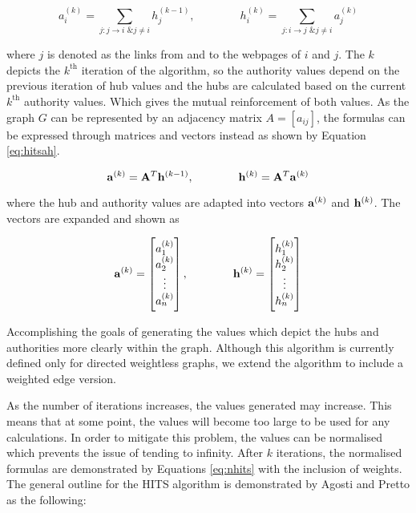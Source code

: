 \begin{equation}
a_i^{(k)} = \sum_{j:j\rightarrow i \text{ \& } j \ne i}h_j^{(k-1)} , \qquad \qquad h_i^{(k)} = \sum_{j:i \rightarrow j \text{ \& } j \ne i}a_j^{(k)}
\end{equation}

where $j$ is denoted as the links from and to the webpages of $i$ and $j$. The $k$ depicts the $k^{\text{th}}$ iteration of the algorithm, so the authority values depend on the previous iteration of hub values and the hubs are calculated based on the current $k^{\text{th}}$ authority values. Which gives the mutual reinforcement of both values. As the graph $G$ can be represented by an adjacency matrix $A = [a_{ij}]$, the formulas can be expressed through matrices \cite{chatzigeorgiou2006application} and vectors instead as shown by Equation \ref{eq:hitsah}.

\begin{equation}\label{eq:hitsah}
\bold{a}^{(k)} = \bold{A}^{T}\bold{h}^{(k-1)} , \qquad \qquad \bold{h}^{(k)} = \bold{A}^{T}\bold{a}^{(k)}
\end{equation}

where the hub and authority values are adapted into vectors $\bold{a}^{(k)}$ and $\bold{h}^{(k)}$. The vectors are expanded and shown as

\begin{equation}
\bold{a}^{(k)} = \begin{bmatrix}
           a_1^{(k)} \\
           a_2^{(k)} \\
           \vdots \\
           a_n^{(k)}
         	\end{bmatrix}
           , \qquad \qquad 
\bold{h}^{(k)} = \begin{bmatrix}
           h_{1}^{(k)} \\
           h_{2}^{(k)} \\
           \vdots \\
           h_{n}^{(k)}
         	\end{bmatrix}
\end{equation}

Accomplishing the goals of generating the values which depict the hubs and authorities more clearly within the graph. Although this algorithm is currently defined only for directed weightless graphs, we extend the algorithm to include a weighted edge version.

As the number of iterations increases, the values generated may increase. This means that at some point, the values will become too large to be used for any calculations. In order to mitigate this problem, the values can be normalised which prevents the issue of tending to infinity. After $k$ iterations, the normalised formulas are demonstrated by Equations \ref{eq:nhits} with the inclusion of weights. The general outline for the HITS algorithm is demonstrated by Agosti and Pretto \cite{agosti2005theoretical} as the following:
\newline

